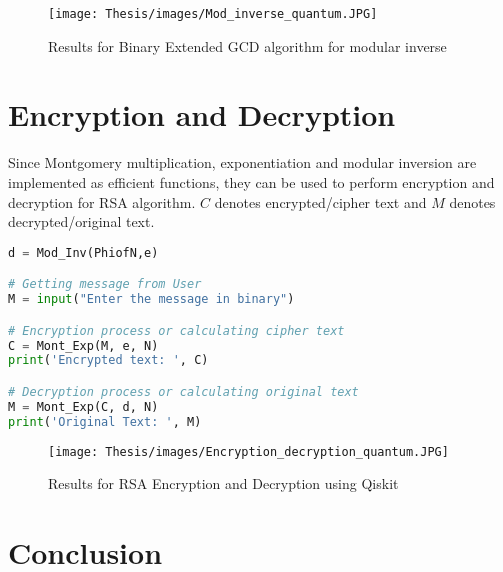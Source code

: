 \documentclass{cpp}
\begin{document}
\begin{figure*}[htp]
    \centering
    \texttt{[image: Thesis/images/Mod\_inverse\_quantum.JPG]}
    \caption{Results for Binary Extended GCD algorithm for modular inverse}
    \label{fig:figure19}
\end{figure*}

\section{Encryption and Decryption}	

Since Montgomery multiplication, exponentiation and modular inversion are implemented as efficient functions, they can be used to perform encryption and decryption for RSA algorithm. $C$ denotes encrypted/cipher text and $M$ denotes decrypted/original text.

\begin{lstlisting}[language=Python]
d = Mod_Inv(PhiofN,e)

# Getting message from User
M = input("Enter the message in binary")

# Encryption process or calculating cipher text
C = Mont_Exp(M, e, N)
print('Encrypted text: ', C)

# Decryption process or calculating original text
M = Mont_Exp(C, d, N)
print('Original Text: ', M)
\end{lstlisting}

\newpage
\begin{figure*}[htp]
    \centering
    \texttt{[image: Thesis/images/Encryption\_decryption\_quantum.JPG]}
    \caption{Results for RSA Encryption and Decryption using Qiskit}
    \label{fig:figure20}
\end{figure*}


\section{Conclusion}

\end{document}
